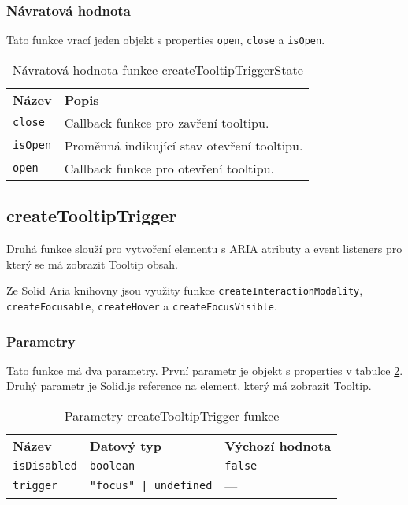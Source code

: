 \subsubsection{Návratová hodnota}

Tato funkce vrací jeden objekt s properties \texttt{open}, \texttt{close} a \texttt{isOpen}.

\begin{table}[ht]\label{table:tooltip-trigger-state-return}
    \begin{ctucolortab}
        \begin{tabularx}{\textwidth}{p{3cm} X}
            \bfseries Název & \bfseries Popis                             \\\Midrule{}
            \texttt{close}  & Callback funkce pro zavření tooltipu.       \\
            \texttt{isOpen} & Proměnná indikující stav otevření tooltipu. \\
            \texttt{open}   & Callback funkce pro otevření tooltipu.
        \end{tabularx}
    \end{ctucolortab}
    \caption{Návratová hodnota funkce createTooltipTriggerState}
\end{table}

\subsection{createTooltipTrigger}

Druhá funkce slouží pro vytvoření elementu s ARIA atributy a event listeners pro který se má zobrazit Tooltip obsah.

Ze Solid Aria knihovny jsou využity funkce \texttt{createInteractionModality}, \texttt{createFocusable}, \texttt{createHover} a \texttt{createFocusVisible}.

\subsubsection{Parametry}

Tato funkce má dva parametry.
První parametr je objekt s properties v tabulce \ref{table:tooltip-trigger-params}.
Druhý parametr je Solid.js reference na element, který má zobrazit Tooltip.

\begin{table}[ht]
    \begin{ctucolortab}
        \begin{tabularx}{\textwidth}{X X X}
            \bfseries Název     & \bfseries Datový typ         & \bfseries Výchozí hodnota \\\Midrule{}
            \texttt{isDisabled} & \texttt{boolean}             & \texttt{false}            \\
            \texttt{trigger}    & \texttt{"focus" | undefined} & ---
        \end{tabularx}
    \end{ctucolortab}
    \caption{Parametry createTooltipTrigger funkce}
    \label{table:tooltip-trigger-params}
\end{table}

